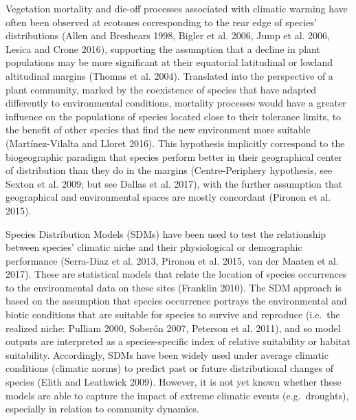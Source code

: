 \documentclass[11pt,twoside]{reedthesis}
\begin{document}
Vegetation mortality and die-off processes associated with climatic
warming have often been observed at ecotones corresponding to the rear
edge of species' distributions (Allen and Breshears 1998, Bigler et al.
2006, Jump et al. 2006, Lesica and Crone 2016), supporting the
assumption that a decline in plant populations may be more significant
at their equatorial latitudinal or lowland altitudinal margins (Thomas
et al. 2004). Translated into the perspective of a plant community,
marked by the coexistence of species that have adapted differently to
environmental conditions, mortality processes would have a greater
influence on the populations of species located close to their tolerance
limits, to the benefit of other species that find the new environment
more suitable (Martínez-Vilalta and Lloret 2016). This hypothesis
implicitly correspond to the biogeographic paradigm that species perform
better in their geographical center of distribution than they do in the
margins (Centre-Periphery hypothesis, see Sexton et al. 2009; but see
Dallas et al. 2017), with the further assumption that geographical and
environmental spaces are mostly concordant (Pironon et al. 2015).\par

Species Distribution Models (SDMs) have been used to test the
relationship between species' climatic niche and their physiological or
demographic performance (Serra-Diaz et al. 2013, Pironon et al. 2015,
van der Maaten et al. 2017). These are statistical models that relate
the location of species occurrences to the environmental data on these
sites (Franklin 2010). The SDM approach is based on the assumption that
species occurrence portrays the environmental and biotic conditions that
are suitable for species to survive and reproduce (i.e.~the realized
niche: Pulliam 2000, Soberón 2007, Peterson et al. 2011), and so model
outputs are interpreted as a species-specific index of relative
suitability or habitat suitability. Accordingly, SDMs have been widely
used under average climatic conditions (climatic norms) to predict past
or future distributional changes of species (Elith and Leathwick 2009).
However, it is not yet known whether these models are able to capture
the impact of extreme climatic events (e.g.~droughts), especially in
relation to community dynamics.\par
\end{document}

